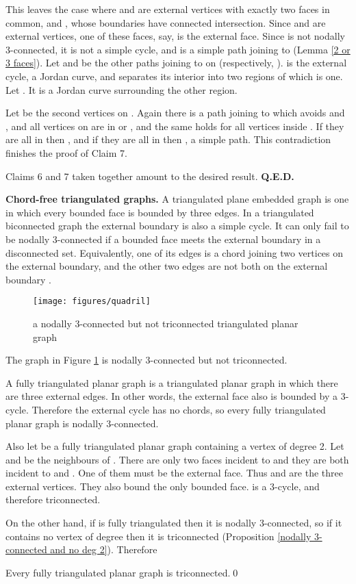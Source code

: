 This leaves the case where  and  are external
vertices with exactly
two faces in common,  and , whose
boundaries have connected intersection.
Since  and  are external vertices,
one of these faces,
 say, is the external face.
Since  is not nodally 3-connected, it is not
a simple cycle, and  is a simple path
joining  to  (Lemma \ref{2 or 3 faces}).
Let  and  be the other paths
joining  to  on  (respectively,
).  is the
external cycle, a Jordan curve, and  separates
its interior into two regions of which  is one.
Let . It is a Jordan curve surrounding
the other region.

Let  be the second vertices
on . Again
there is a path joining  to  which
avoids  and , and
all vertices on  are in  or , and
the same holds for all vertices inside .
If they are all in  then , and if they
are all in  then , a simple path.
This contradiction finishes the proof of Claim 7.

Claims 6 and 7 taken together amount to the desired result.
{\bf Q.E.D.}\medskip

\numpara
\label{chord-free triangulated graphs} {\bf Chord-free triangulated graphs.}
A triangulated plane embedded graph is one in which every
bounded face is bounded by three edges.  In a triangulated
biconnected graph the external boundary is also a simple cycle.
It can only fail to be nodally 3-connected if a bounded
face meets the external boundary in a disconnected set.
Equivalently, one of its edges is a chord joining
two vertices on the external boundary,
and the other two edges are not both on the external boundary
\cite{white}.

\begin{figure}
\centerline{\texttt{[image: figures/quadril]}}
\caption{a nodally 3-connected but not triconnected triangulated
planar graph}
\label{quadril.fig}
\end{figure}

The graph in Figure \ref{quadril.fig} is nodally 3-connected but
not triconnected.


A fully triangulated planar graph is a triangulated planar
graph in which there are three external edges. In other words,
the external face also is bounded by a 3-cycle.  Therefore the
external cycle has no chords, so every fully triangulated
planar graph is nodally 3-connected.

Also let  be a fully triangulated planar graph containing
a vertex  of degree 2. Let  and 
be the neighbours of . There are only two faces
incident to  and they are both incident to
 and .  One of them must be
the external face. Thus  and  are the
three external vertices.  They also bound
the only bounded face.   is a 3-cycle,
and therefore triconnected.

On the other hand,
if  is fully triangulated
then it is nodally 3-connected,
so if it contains no vertex of degree 
then it is triconnected
(Proposition
\ref{nodally 3-connected and no deg 2}).  Therefore

\begin{corollary}
Every fully triangulated planar graph is triconnected.\qed
\end{corollary}

